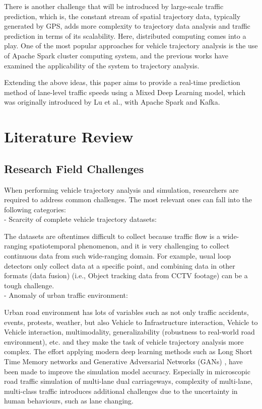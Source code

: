 \documentclass[11pt]{uonthesis}
\begin{document}
There is another challenge that will be introduced by large-scale traffic prediction, which is, the constant stream of spatial trajectory data, typically generated by GPS, adds more complexity to trajectory data analysis and traffic prediction in terms of its scalability. Here, distributed computing comes into a play. One of the most popular approaches for vehicle trajectory analysis is the use of Apache Spark cluster computing system, and the previous works\cite{9077707}\cite{Sigurdsson2018RoadTC} have examined the applicability of the system to trajectory analysis.

Extending the above ideas, this paper aims to provide a real-time prediction method of lane-level traffic speeds using a Mixed Deep Learning model, which was originally introduced by Lu et al.\cite{9284587}, with Apache Spark and Kafka. 

\chapter{Literature Review}
\section{Research Field Challenges}
When performing vehicle trajectory analysis and simulation, researchers are required to address common challenges. The most relevant ones can fall into the following categories:
\\
\noindent- Scarcity of complete vehicle trajectory datasets:

The datasets are oftentimes difficult to collect because traffic flow is a wide-ranging spatiotemporal phenomenon, and it is very challenging to collect continuous data from such wide-ranging domain\cite{seo2020evaluation}. For example, usual loop detectors only collect data at a specific point, and combining data in other formats (data fusion) (i.e., Object tracking data from CCTV footage) can be a tough challenge.
\\
\noident- Anomaly of urban traffic environment:

Urban road environment has lots of variables such as not only traffic accidents, events, protests, weather, but also Vehicle to Infrastructure interaction, Vehicle to Vehicle interaction, multimodality, generalizability (robustness to real-world road environment), etc. and they make the task of vehicle trajectory analysis more complex. The effort applying modern deep learning methods such as Long Short Time Memory networks and Generative Adversarial Networks (GANs) \cite{rossi2021vehicle}, have been made to improve the simulation model accuracy. Especially in microscopic road traffic simulation of multi-lane dual carriageways, complexity of multi-lane, multi-class traffic introduces additional challenges due to the uncertainty in human behaviours, such as lane changing\cite{DAHIYA2022100066}.
\end{document}
